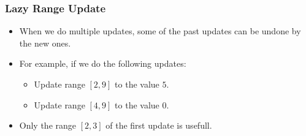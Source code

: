 \documentclass{beamer}
\begin{document}
\begin{frame}%
\frametitle{Lazy Range Update}

\begin{itemize}

\item When we do multiple updates, some of the past updates can be undone by the new ones.

\vspace{0.2cm}

\item<2-> For example, if we do the following updates:

\begin{itemize}

\item<2-> Update range $[2,9]$ to the value $5$.

\vspace{0.08cm}

\item<2-> Update range $[4,9]$ to the value $0$.

\end{itemize}

\vspace{0.2cm}

\item<3-> Only the range $[2,3]$ of the first update is usefull.

\end{itemize}

\end{frame}
\end{document}
